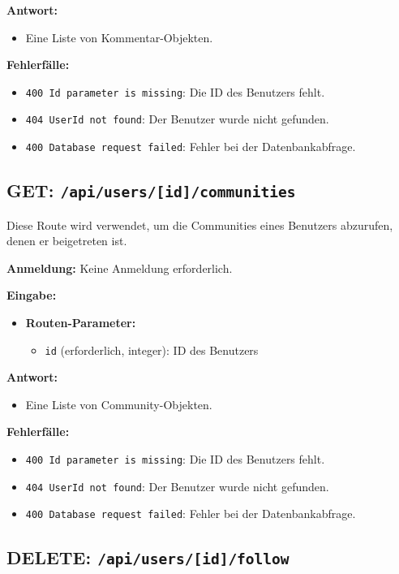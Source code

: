 \documentclass[a4paper,12pt]{article}
\begin{document}
\textbf{Antwort:}
\begin{itemize}
    \item Eine Liste von Kommentar-Objekten.
\end{itemize}

\textbf{Fehlerfälle:}
\begin{itemize}
    \item \texttt{400 Id parameter is missing}:
        Die ID des Benutzers fehlt.
    \item \texttt{404 UserId not found}:
        Der Benutzer wurde nicht gefunden.
    \item \texttt{400 Database request failed}:
        Fehler bei der Datenbankabfrage.
\end{itemize}

\subsection{GET: \texttt{/api/users/[id]/communities}}

Diese Route wird verwendet, um die Communities eines Benutzers abzurufen, denen
er beigetreten ist.

\textbf{Anmeldung:} Keine Anmeldung erforderlich.

\textbf{Eingabe:}
\begin{itemize}
    \item \textbf{Routen-Parameter:}
    \begin{itemize}
        \item \texttt{id} (erforderlich, integer):
            ID des Benutzers
    \end{itemize}
\end{itemize}

\textbf{Antwort:}
\begin{itemize}
    \item Eine Liste von Community-Objekten.
\end{itemize}

\textbf{Fehlerfälle:}
\begin{itemize}
    \item \texttt{400 Id parameter is missing}:
        Die ID des Benutzers fehlt.
    \item \texttt{404 UserId not found}:
        Der Benutzer wurde nicht gefunden.
    \item \texttt{400 Database request failed}:
        Fehler bei der Datenbankabfrage.
\end{itemize}

\subsection{DELETE: \texttt{/api/users/[id]/follow}}
\end{document}

